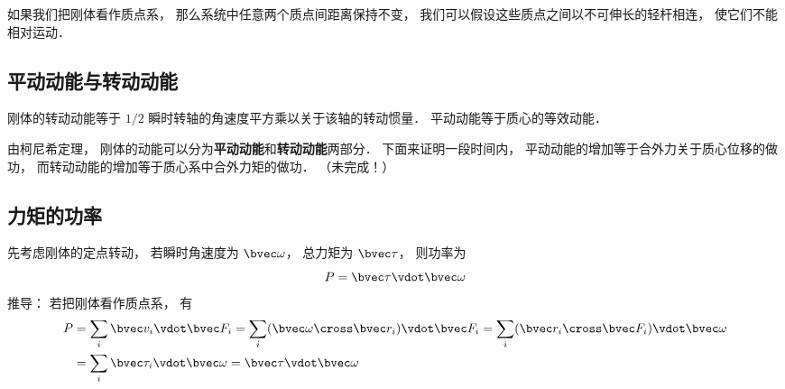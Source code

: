 
\begin{issues}
\issueDraft
\end{issues}


如果我们把刚体看作质点系， 那么系统中任意两个质点间距离保持不变， 我们可以假设这些质点之间以不可伸长的轻杆相连， 使它们不能相对运动．

\subsection{平动动能与转动动能}

刚体的转动动能等于 $1/2$ 瞬时转轴的角速度平方乘以关于该轴的转动惯量． 平动动能等于质心的等效动能．

由柯尼希定理， 刚体的动能可以分为\textbf{平动动能}和\textbf{转动动能}两部分． 下面来证明一段时间内， 平动动能的增加等于合外力关于质心位移的做功， 而转动动能的增加等于质心系中合外力矩的做功．
（未完成！）

\subsection{力矩的功率}
先考虑刚体的定点转动， 若瞬时角速度为 $\bvec \omega$， 总力矩为 $\bvec \tau$， 则功率为
\begin{equation}
P = \bvec \tau\vdot \bvec \omega
\end{equation}
推导： 若把刚体看作质点系， 有
\begin{equation}
\begin{aligned}
P &= \sum_i \bvec v_i \vdot \bvec F_i
= \sum_i (\bvec \omega \cross \bvec r_i) \vdot \bvec F_i
= \sum_i (\bvec r_i\cross\bvec F_i)\vdot \bvec \omega\\
&= \sum_i \bvec \tau_i \vdot \bvec \omega = \bvec \tau\vdot \bvec \omega
\end{aligned}
\end{equation}



